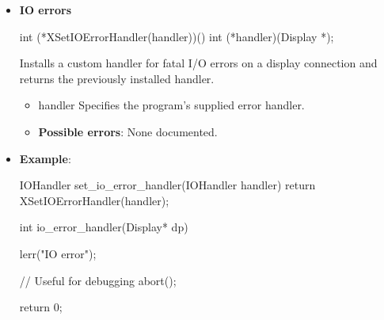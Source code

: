 \documentclass{report}
\begin{document}
\begin{itemize}
\begin{cppcode}
{                    XGetErrorText(
                        dp, 
                        error_event->error_code,
                        error_str,
                        DEFAULT_ERROR_STR_LEN
                    );

                    fprintf(stderr, 
                        "%
                        error_str, 
                        "Serial", error_event->serial,
                        "Minor code", error_event->minor_code,
                        "Request code", error_event->request_code,
                        "Resource ID", error_event->resourceid
                    );

                    // Useful for gdb; stops execution at failing request
                    abort();

                    return 0;
                }
            \end{cppcode}
        \item \textbf{IO errors}
            \bigbreak \noindent 
            \begin{cppcode}
                int (*XSetIOErrorHandler(handler))()
                    int (*handler)(Display *);
            \end{cppcode}
            \bigbreak \noindent
            Installs a custom handler for fatal I/O errors on a display connection and returns the previously installed handler.
            \begin{itemize}
                \item handler Specifies the program’s supplied error handler.
            \end{itemize}
            \begin{itemize}
                \item \textbf{Possible errors}: None documented.
            \end{itemize}
        \item \textbf{Example}:
            \bigbreak \noindent 
            \begin{cppcode}
                IOHandler set_io_error_handler(IOHandler handler) {
                    return XSetIOErrorHandler(handler);
                }

                int io_error_handler(Display* dp) {
                    lerr("IO error");

                    // Useful for debugging
                    abort();

                    return 0;
                }
            \end{cppcode}

    \end{itemize}
\end{document}
